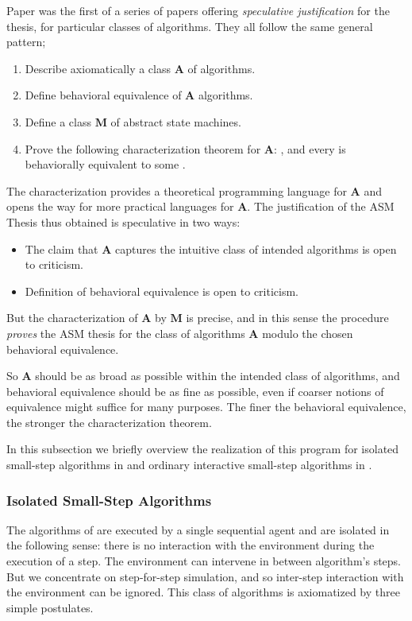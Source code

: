 \documentclass{LMCS}
\theoremstyle{definition}
\newcommand{\bld}[1]{\ensuremath{\mathbf {#1}}}
\begin{document}
Paper \cite{seqth} was the first of a series of papers offering
\emph{speculative justification} for the thesis, for particular
classes of algorithms. They all follow the same general pattern;
\begin{enumerate}
\item Describe axiomatically a class \bld{A} of algorithms.
\item Define behavioral equivalence of \bld{A} algorithms.
\item Define a class \bld{M} of abstract state machines.
\item Prove the following characterization theorem for \bld{A}:
, and every  is
behaviorally equivalent to some .
\end{enumerate}
The characterization provides a theoretical programming language for
\bld{A} and opens the way for more practical languages for
\bld{A}. The justification of the ASM Thesis thus obtained is speculative
in two ways:
\begin{itemize}
\item The claim that \bld{A} captures the intuitive class of intended
algorithms is open to criticism.
\item Definition of behavioral equivalence is open to criticism.
\end{itemize}
But the characterization of \bld{A} by \bld{M} is precise, and in this
sense the procedure \emph{proves} the ASM thesis for the class of
algorithms \bld{A} modulo the chosen behavioral equivalence.

So \bld{A} should be as broad as possible within the intended class of
algorithms, and behavioral equivalence should be as fine as possible, even
if coarser notions of equivalence might suffice for many purposes.  The
finer the behavioral equivalence, the stronger the characterization
theorem.

In this subsection we briefly overview the realization of this program
for isolated small-step algorithms in \cite{seqth} and ordinary
interactive small-step algorithms in \cite{oa1,oa2,oa3}.

\subsubsection{Isolated Small-Step
Algorithms}\label{sec:overview:seqth}

The algorithms of \cite{seqth} are executed by a single sequential agent
and are isolated in the following sense: there is no interaction with the
environment during the execution of a step.  The environment can intervene
in between algorithm's steps.  But we concentrate on step-for-step
simulation, and so inter-step interaction with the environment can be
ignored.  This class of algorithms is axiomatized by three simple
postulates.
\end{document}
